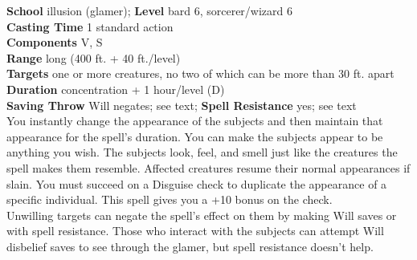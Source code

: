 \textbf{School }illusion (glamer); \textbf{Level} bard 6, sorcerer/wizard 6\\
\textbf{Casting Time} 1 standard action\\
\textbf{Components} V, S\\
\textbf{Range} long (400 ft. + 40 ft./level)\\
\textbf{Targets} one or more creatures, no two of which can be more than 30 ft. apart\\
\textbf{Duration} concentration + 1 hour/level (D)\\
\textbf{Saving Throw }Will negates; see text; \textbf{Spell Resistance} yes; see text\\
You instantly change the appearance of the subjects and then maintain that appearance for the spell's duration. You can make the subjects appear to be anything you wish. The subjects look, feel, and smell just like the creatures the spell makes them resemble. Affected creatures resume their normal appearances if slain. You must succeed on a Disguise check to duplicate the appearance of a specific individual. This spell gives you a +10 bonus on the check.\\
Unwilling targets can negate the spell's effect on them by making Will saves or with spell resistance. Those who interact with the subjects can attempt Will disbelief saves to see through the glamer, but spell resistance doesn't help.\\
